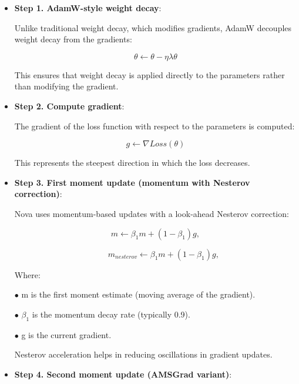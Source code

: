 \documentclass{article}
\begin{document}
\begin{itemize}



\item {\bf Step 1. AdamW-style weight decay}:


Unlike traditional weight decay, which modifies gradients, AdamW decouples weight decay from the gradients:


\begin{equation}
\theta \leftarrow \theta - \eta\lambda\theta
\end{equation}


This ensures that weight decay is applied directly to the parameters rather than modifying the gradient.

\item {\bf Step 2. Compute gradient}:

The gradient of the loss function with respect to the parameters is computed:



\begin{equation}
g \leftarrow \nabla Loss(\theta)
\end{equation}


This represents the steepest direction in which the loss decreases.

\item {\bf Step 3. First moment update (momentum with Nesterov correction)}:

Nova uses momentum-based updates with a look-ahead Nesterov correction:

\begin{equation}
m \leftarrow \beta_1m+(1-\beta_1)g, 
\end{equation}

\begin{equation}
~~~~~~~~~m_{nesterov} \leftarrow \beta_1m+(1-\beta_1)g, 
\end{equation}

Where:



$\bullet$ m is the first moment estimate (moving average of the gradient).

​$\bullet$ $\beta_1$  is the momentum decay rate (typically 0.9).

$\bullet$ g is the current gradient.

Nesterov acceleration helps in reducing oscillations in gradient updates.


\item {\bf Step 4. Second moment update (AMSGrad variant)}:


\end{itemize}
\end{document}
